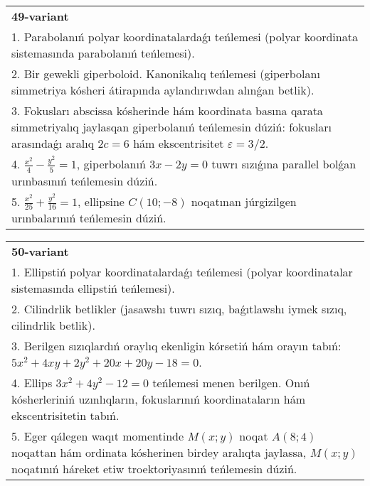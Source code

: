 \documentclass{article}
\begin{document}
\begin{tabular}{m{17cm}}
\textbf{49-variant}\\
1. Parabolanıń polyar koordinatalardaǵı teńlemesi (polyar koordinata sistemasında parabolanıń teńlemesi).\\

2. Bir gewekli giperboloid. Kanonikalıq teńlemesi (giperbolanı simmetriya kósheri átirapında aylandırıwdan alınǵan betlik).\\

3. Fokusları abscissa kósherinde hám koordinata basına qarata simmetriyalıq jaylasqan giperbolanıń teńlemesin dúziń: fokusları arasındaǵı aralıq $2 c=6$ hám ekscentrisitet $\varepsilon=3/2$.\\

4. $\frac{x^{2}}{4} - \frac{y^{2}}{5} = 1$, giperbolanıń $3x - 2y = 0$ tuwrı sızıǵına parallel bolǵan urınbasınıń teńlemesin dúziń.  \\

5. $\frac{x^{2}}{25} + \frac{y^{2}}{16} = 1$, ellipsine $C(10; - 8)$ noqatınan júrgizilgen urınbalarınıń teńlemesin dúziń.  
\end{tabular}
\vspace{1cm}


\begin{tabular}{m{17cm}}
\textbf{50-variant}\\
1. Ellipstiń polyar koordinatalardaǵı teńlemesi (polyar koordinatalar sistemasında ellipstiń teńlemesi).\\

2. Cilindrlik betlikler (jasawshı tuwrı sızıq, baǵıtlawshı iymek sızıq, cilindrlik betlik).\\

3. Berilgen sızıqlardıń oraylıq ekenligin kórsetiń hám orayın tabıń: $5 x^{2}+4 xy+2 y^{2}+20 x+20 y-18=0$.\\

4. Ellips $3x^{2} + 4y^{2} - 12 = 0$ teńlemesi menen berilgen. Onıń kósherleriniń uzınlıqların, fokuslarınıń koordinataların hám ekscentrisitetin tabıń.  \\

5. Eger qálegen waqıt momentinde $M(x;y)$ noqat $A(8;4)$ noqattan hám ordinata kósherinen birdey aralıqta jaylassa, $M(x;y)$ noqatınıń háreket etiw troektoriyasınıń teńlemesin dúziń.  
\end{tabular}
\vspace{1cm}
\end{document}
